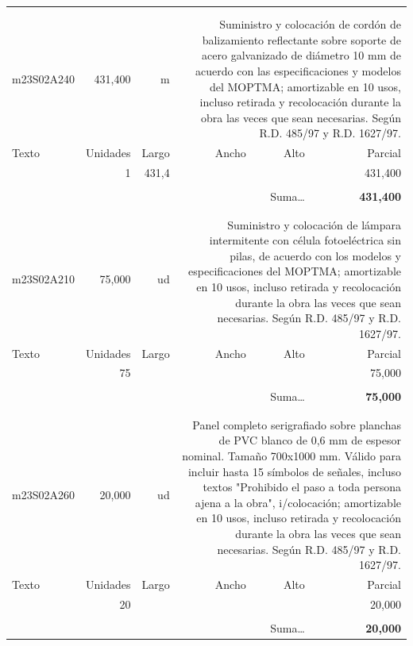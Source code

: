 \documentclass{book}%
\begin{document}
\begin{longtable}{lrrrrr}
\hline%
&&&&&\\%
&&&&&\\%
m23S02A240&   431,400& m&\multicolumn{3}{p{6cm}}{\scriptsize Suministro y colocación de cordón de balizamiento reflectante sobre soporte de acero galvanizado de diámetro 10 mm de acuerdo con las especificaciones y modelos del MOPTMA; amortizable en 10 usos, incluso retirada y recolocación durante la obra las veces que sean necesarias. Según R.D. 485/97 y R.D. 1627/97.\normalsize}\\%
Texto&Unidades&Largo&Ancho&Alto&Parcial\\%
\hline%
\multicolumn{1}{p{3.5cm}}{ }&1&431,4&&&   431,400\\%
&&&&&\\%
\multicolumn{5}{r}{Suma\ldots}&\textbf{   431,400}\\%
\hline%
&&&&&\\%
&&&&&\\%
m23S02A210&    75,000& ud&\multicolumn{3}{p{6cm}}{\scriptsize Suministro y colocación de lámpara intermitente con célula fotoeléctrica sin pilas, de acuerdo con los modelos y especificaciones del MOPTMA; amortizable en 10 usos, incluso retirada y recolocación durante la obra las veces que sean necesarias. Según R.D. 485/97 y R.D. 1627/97.\normalsize}\\%
Texto&Unidades&Largo&Ancho&Alto&Parcial\\%
\hline%
\multicolumn{1}{p{3.5cm}}{ }&75&&&&    75,000\\%
&&&&&\\%
\multicolumn{5}{r}{Suma\ldots}&\textbf{    75,000}\\%
\hline%
&&&&&\\%
&&&&&\\%
m23S02A260&    20,000& ud&\multicolumn{3}{p{6cm}}{\scriptsize Panel completo serigrafiado sobre planchas de PVC blanco de 0,6 mm de espesor nominal. Tamaño 700x1000 mm. Válido para incluir hasta 15 símbolos de señales, incluso textos "Prohibido el paso a toda persona ajena a la obra", i/colocación; amortizable en 10 usos, incluso retirada y recolocación durante la obra las veces que sean necesarias. Según R.D. 485/97 y R.D. 1627/97.\normalsize}\\%
Texto&Unidades&Largo&Ancho&Alto&Parcial\\%
\hline%
\multicolumn{1}{p{3.5cm}}{ }&20&&&&    20,000\\%
&&&&&\\%
\multicolumn{5}{r}{Suma\ldots}&\textbf{    20,000}\\%

\end{longtable}
\end{document}

